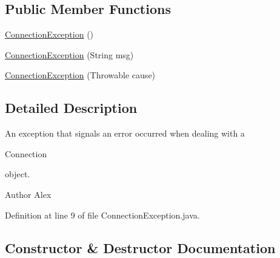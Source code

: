 \subsection*{Public Member Functions}
\begin{DoxyCompactItemize}
\item 
\hyperlink{classpt_1_1up_1_1fe_1_1lpro1613_1_1sharedlib_1_1exceptions_1_1_connection_exception_a0263c99be76976a295eb555d769ad902}{Connection\+Exception} ()
\item 
\hyperlink{classpt_1_1up_1_1fe_1_1lpro1613_1_1sharedlib_1_1exceptions_1_1_connection_exception_a7ffdcb8ba15364c95b96154fef1624ee}{Connection\+Exception} (String msg)
\item 
\hyperlink{classpt_1_1up_1_1fe_1_1lpro1613_1_1sharedlib_1_1exceptions_1_1_connection_exception_a78daf9e69ac5d62dfc64bca6da1115a7}{Connection\+Exception} (Throwable cause)
\end{DoxyCompactItemize}


\subsection{Detailed Description}
An exception that signals an error occurred when dealing with a 
\begin{DoxyCode}
Connection 
\end{DoxyCode}
 object.

\begin{DoxyAuthor}{Author}
Alex 
\end{DoxyAuthor}


Definition at line 9 of file Connection\+Exception.\+java.



\subsection{Constructor \& Destructor Documentation}
\hypertarget{classpt_1_1up_1_1fe_1_1lpro1613_1_1sharedlib_1_1exceptions_1_1_connection_exception_a0263c99be76976a295eb555d769ad902}{}\label{classpt_1_1up_1_1fe_1_1lpro1613_1_1sharedlib_1_1exceptions_1_1_connection_exception_a0263c99be76976a295eb555d769ad902} 
